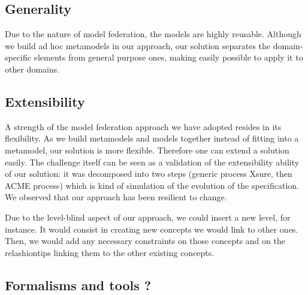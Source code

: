   \subsection{Generality}


  Due to the nature of model federation, the models are highly reusable.
  Although we build ad hoc metamodels in our approach, our solution separates
  the domain-specific elements from general purpose ones, making easily
  possible to apply it to other domains. 

  \subsection{Extensibility}


  A strength of the  model federation approach we have adopted resides in its
  flexibility. As we build metamodels and models together instead of fitting
  into a metamodel, our solution is more flexible. Therefore one can extend a
  solution easily. The challenge itself can be seen as a validation of the
  extensibility ability of our solution: it was decomposed into two steps
  (generic process Xsure, then ACME process) which is kind of simulation of the
  evolution of the  specification. We observed that our approach has been
  resilient to change.

  Due to the level-blind aspect of our approach, we could insert a new level,
  for instance. It would consist in creating new concepts we would link to
  other ones. Then, we would add any necessary constraints on those concepts
  and on the relashiontips linking them to the other existing concepts. 


  
\subsection{Formalisms and tools ?}


